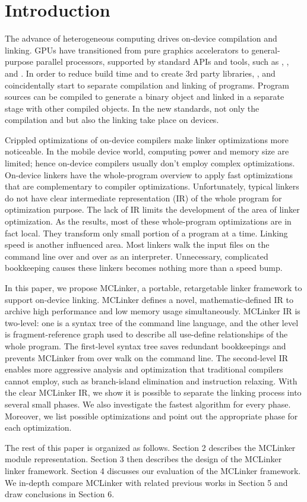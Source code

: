 \section{Introduction}
The advance of heterogeneous computing drives on-device compilation and linking. GPUs have transitioned from pure graphics accelerators to general-purpose parallel processors, supported by standard APIs and tools, such as \cite{CUDA}, \cite{OpenCL}, \cite{DirectCompute} and \cite{HSA}. In order to reduce build time and to create 3rd party libraries, \cite{CUDA}, \cite{OpenCL} and \cite{HSA} coincidentally start to separate compilation and linking of programs. Program sources can be compiled to generate a binary object and linked in a separate stage with other compiled objects. In the new standards, not only the compilation and but also the linking take place on devices.

Crippled optimizations of on-device compilers make linker optimizations more noticeable. In the mobile device world, computing power and memory size are limited; hence on-device compilers usually don't employ complex optimizations. On-device linkers have the whole-program overview to apply fast optimizations that are complementary to compiler optimizations. Unfortunately, typical linkers do not have clear intermediate representation (IR) of the whole program for optimization purpose. The lack of IR limits the development of the area of linker optimization. As the results, most of these whole-program optimizations are in fact local. They transform only small portion of a program at a time. Linking speed is another influenced area. Most linkers walk the input files on the command line over and over as an interpreter. Unnecessary, complicated bookkeeping causes these linkers becomes nothing more than a speed bump.

In this paper, we propose MCLinker, a portable, retargetable linker framework to support on-device linking. MCLinker defines a novel, mathematic-defined IR to archive high performance and low memory usage simultaneously. MCLinker IR is two-level: one is a syntax tree of the command line language, and the other level is fragment-reference graph used to describe all use-define relationships of the whole program. The first-level syntax tree saves redundant bookkeepings and prevents MCLinker from over walk on the command line. The second-level IR enables more aggressive analysis and optimization that traditional compilers cannot employ, such as branch-island elimination and instruction relaxing. With the clear MCLinker IR, we show it is possible to separate the linking process into several small phases. We also investigate the fastest algorithm for every phase. Moreover, we list possible optimizations and point out the appropriate phase for each optimization.

The rest of this paper is organized as follows. Section 2 describes the MCLinker module representation. Section 3 then describes the design of the MCLinker linker framework. Section 4 discusses our evaluation of the MCLinker framework. We in-depth compare MCLinker with related previous works in Section 5 and draw conclusions in Section 6.
